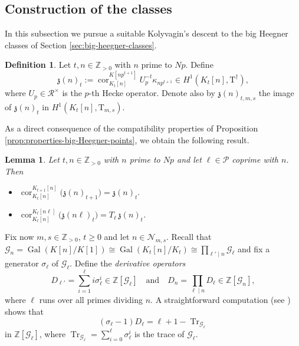 \documentclass[12pt,reqno]{amsart}
\newtheorem{lemma}[theorem]{Lemma}
\theoremstyle{definition}
\newtheorem{definition}[theorem]{Definition}
\theoremstyle{remark}
\newcommand{\numberset}{\mathbb}
\newcommand{\Z}{\numberset{Z}}
\newcommand{\T}{\boldsymbol{\mathrm{T}}}
\DeclareMathOperator{\Gal}{Gal}
\DeclareMathOperator{\Tr}{Tr}
\DeclareMathOperator{\Cor}{cor}
\newcommand{\gk}{\kappa}
\newcommand{\gs}{\sigma}
\begin{document}
\subsection{Construction of the classes}

In this subsection we pursue a suitable Kolyvagin's descent to the big Heegner classes of  Section \ref{sec:big-heegner-classes}. 

\begin{definition}\label{def:classes-zeta}
        Let $t, n\in\Z_{>0}$ with $n$ prime to $Np$. Define
        \begin{equation*}
		\mathfrak{z}(n)_t:=\Cor_{K_t[n]}^{K[np^{t+1}]} U_p^{-t}\gk_{np^{t+1}}\in H^1(K_t[n],\T^\dag),
		\end{equation*}
        where $U_p\in \mathcal{R}^{\times}$ is the $p$-th Hecke operator. Denote also by $\mathfrak{z}(n)_{t,m,s}$ the image of $\mathfrak{z}(n)_t$ in $H^1(K_t[n],\T_{m,s})$.
\end{definition}

As a direct consequence of the compatibility properties of Proposition \ref{prop:properties-big-Heegner-points}, we obtain the following result.

\begin{lemma}\label{lem:compatibility-of-z}
    Let $t, n\in\Z_{>0}$ with $n$ prime to $Np$ and let $\ell\in\mathcal{P}$ coprime with $n$. Then
    \begin{itemize}
        \item[(a)] $\Cor_{K_{t}[n]}^{K_{t+1}[n]}\big(\mathfrak{z}(n)_{t+1}\big)=\mathfrak{z}(n)_{t}.$
        \item[(b)] $\Cor_{K_t[n]}^{K_t[n\ell]}\big(\mathfrak{z}(n\ell)_{t}\big)=T_\ell \, \mathfrak{z}(n)_{t}$.
    \end{itemize}
\end{lemma}

Fix now $m,s\in\Z_{>0}$, $t\ge 0$ and let $n\in\mathcal{N}_{m,s}$. Recall that $\mathcal{G}_n=\Gal(K[n]/K[1])\cong\Gal(K_t[n]/K_t)\cong \prod_{\ell'\mid n}\mathcal{G}_{\ell}$ and fix a generator $\sigma_{\ell}$ of $\mathcal{G}_{\ell}$. Define the \emph{derivative operators} 
\begin{equation*}
    D_{\ell'}=\sum_{i=1}^{\ell}i\gs_{\ell}^i\in \Z[\mathcal{G}_{\ell}]\quad\text{and}\quad D_n=\prod_{\ell\mid n} D_{\ell}\in\Z[\mathcal{G}_n],
\end{equation*}
where $\ell$ runs over all primes dividing $n$. A straightforward computation (see \cite[(3.5)]{Gross91:Kolyvagins-work}) shows that
\begin{equation}\label{eq:formula-derivative-operators}
    (\gs_{\ell}-1)D_{\ell}=\ell+1-\Tr_{\mathcal{G}_{\ell}}
\end{equation}
in $\Z[\mathcal{G}_{\ell}]$, where $\Tr_{\mathcal{G}_{\ell}}=\sum_{i=0}^{\ell}\gs_{\ell}^i$ is the trace of $\mathcal{G}_{\ell}$. 
\end{document}

